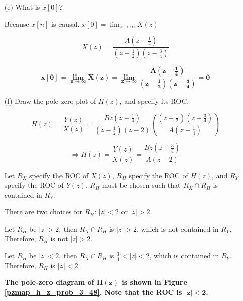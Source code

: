 \documentclass[fleqn]{article}
\begin{document}
\begin{enumerate}[nolistsep]
\begin{enumerate} [nolistsep]
						\textbf{Because $\mathbf{X(z)}$ does not have a pole at $\mathbf{z = \infty}$, $\mathbf{x[n]}$ must be causal.}
					
					\pagebreak	
					\item[(e)] What is $x[0]$?
					
						Because $x[n]$ is causal. $x[0] = \displaystyle\lim_{z\to\infty}{X(z)}$
						
						\begin{equation*}
							X(z) = \frac{A\left(z - \frac{1}{4}\right)}{\left(z - \frac{1}{2}\right)\left(z - \frac{3}{4}\right)}
						\end{equation*}
						
						\begin{equation*}
							\mathbf{x[0] = \displaystyle\lim_{n\to\infty}{X(z)} = \displaystyle\lim_{z\to\infty}{\frac{A\left(z - \frac{1}{4}\right)}{\left(z - \frac{1}{2}\right)\left(z - \frac{3}{4}\right)}} = 0}
						\end{equation*}
							
					\item[(f)] Draw the pole-zero plot of $H(z)$, and specify its ROC.
					
					\begin{equation*}
						H(z) = \frac{Y(z)}{X(z)} = \frac{Bz\left(z - \frac{1}{4}\right)}{\left(z - \frac{1}{2}\right)\left(z - 2\right)}\left(\frac{\left(z - \frac{1}{2}\right)\left(z - \frac{3}{4}\right)}{A\left(z - \frac{1}{4}\right)}\right)
					\end{equation*}
					
					\begin{equation*}
						\Rightarrow H(z) = \frac{Y(z)}{X(z)} = \frac{Bz\left(z - \frac{3}{4}\right)}{A\left(z - 2\right)}
					\end{equation*}
					
					Let $R_X$ specify the ROC of $X(z)$, $R_H$ specify the ROC of $H(z)$, and $R_Y$ specify the ROC of $Y(z)$. $R_H$ must be chosen such that $R_X \cap R_H$ is contained in $R_Y$. 
					
					There are two choices for $R_H$: $|z| < 2$ or $|z| > 2$.
					
					Let $R_H$ be $|z| > 2$, then $R_X \cap R_H$ is $|z| > 2$, which is not contained in $R_Y$. Therefore, $R_H$ is not $|z| > 2$.
					
					Let $R_H$ be $|z| < 2$, then $R_X \cap R_H$ is $\frac{3}{4} < |z| < 2$, which is contained in $R_Y$. Therefore, $R_H$ is $|z| < 2$.
					
					\textbf{The pole-zero diagram of $\mathbf{H(z)}$ is shown in Figure \ref{pzmap_h_z_prob_3_48}. Note that the ROC is $\mathbf{|z| < 2}$.}
					

\end{enumerate}
\end{enumerate}
\end{document}
